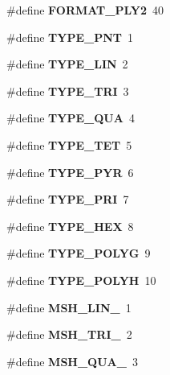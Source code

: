 \begin{DoxyCompactItemize}
\item 
\#define {\bfseries F\-O\-R\-M\-A\-T\-\_\-\-P\-L\-Y2}~40\label{GmshDefines_8h_a2171e0e08d79184e640de826c33b21fc}

\item 
\#define {\bfseries T\-Y\-P\-E\-\_\-\-P\-N\-T}~1\label{GmshDefines_8h_a814f01d6c8dd9dd26b1cfd9066d7427d}

\item 
\#define {\bfseries T\-Y\-P\-E\-\_\-\-L\-I\-N}~2\label{GmshDefines_8h_a5086a4866222755d70bb1103c88fb8bb}

\item 
\#define {\bfseries T\-Y\-P\-E\-\_\-\-T\-R\-I}~3\label{GmshDefines_8h_a89ae650c877936f4a285e922ce0f511e}

\item 
\#define {\bfseries T\-Y\-P\-E\-\_\-\-Q\-U\-A}~4\label{GmshDefines_8h_ad8df26a884f7b9f942f449d303fbbd41}

\item 
\#define {\bfseries T\-Y\-P\-E\-\_\-\-T\-E\-T}~5\label{GmshDefines_8h_ad8f2f95896d7ba5127ad6225eef1e8b1}

\item 
\#define {\bfseries T\-Y\-P\-E\-\_\-\-P\-Y\-R}~6\label{GmshDefines_8h_a9314d3d1adfa8d135cc4a5b916fd2968}

\item 
\#define {\bfseries T\-Y\-P\-E\-\_\-\-P\-R\-I}~7\label{GmshDefines_8h_abf980bac9364f1bd14321bae0bbcf93c}

\item 
\#define {\bfseries T\-Y\-P\-E\-\_\-\-H\-E\-X}~8\label{GmshDefines_8h_ad1ce9656ee53ab48f53bc66b9e85849d}

\item 
\#define {\bfseries T\-Y\-P\-E\-\_\-\-P\-O\-L\-Y\-G}~9\label{GmshDefines_8h_a81e3e0730aa8da288a31515dc03dc454}

\item 
\#define {\bfseries T\-Y\-P\-E\-\_\-\-P\-O\-L\-Y\-H}~10\label{GmshDefines_8h_ade40e16811093c42bd9728ea50ea969c}

\item 
\#define {\bfseries M\-S\-H\-\_\-\-L\-I\-N\-\_}~1\label{GmshDefines_8h_a41957c7f068b7aa3e8a1dadeb34b9084}

\item 
\#define {\bfseries M\-S\-H\-\_\-\-T\-R\-I\-\_}~2\label{GmshDefines_8h_acbeb6af581001d460979106dc9268006}

\item 
\#define {\bfseries M\-S\-H\-\_\-\-Q\-U\-A\-\_}~3\label{GmshDefines_8h_a0c36a3a5a8b5f29685f4447634aceeca}


\end{DoxyCompactItemize}
